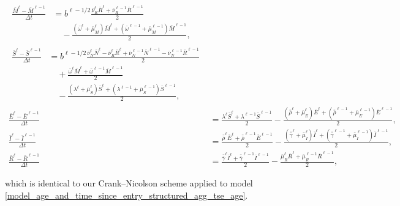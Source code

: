 \documentclass{jpmarticle}
\let\subequationsorig\subequations%
\let\endsubequationsorig\endsubequations%
\renewenvironment{subequations}{
  \subequationsorig
  \renewcommand{\theequation}{\theparentequation.\arabic{equation}}
}{
  \endsubequationsorig
}
\begin{document}
\begin{subequations}
  \label{numerics_age_and_time_since_entry_structured_agg_tse_age}
  \begin{align}
    \begin{split}
      \frac{\bar{M}^{\ell} - \bar{M}^{\ell - 1}}{\Delta t}
      &= b^{\ell - 1 / 2} \frac{\bar{\nu}_R^{\ell} \bar{R}^{\ell}
        + \bar{\nu}_R^{\ell - 1} \bar{R}^{\ell - 1}}{2}
      \\ & \quad {}
      - \frac{(\bar{\omega}^{\ell} + \bar{\mu}_M^{\ell}) \bar{M}^{\ell}
        + (\bar{\omega}^{\ell - 1} + \bar{\mu}_M^{\ell - 1}) \bar{M}^{\ell - 1}}
      {2},
    \end{split}
    \\
    \begin{split}
      \frac{\bar{S}^{\ell} - \bar{S}^{\ell - 1}}{\Delta t}
      &= b^{\ell - 1 / 2}
      \frac{\bar{\nu}_N^{\ell} \bar{N}^{\ell}
        - \bar{\nu}_R^{\ell} \bar{R}^{\ell}
        + \bar{\nu}_N^{\ell - 1} \bar{N}^{\ell - 1}
        - \bar{\nu}_N^{\ell - 1} \bar{R}^{\ell - 1}}{2}
      \\ & \quad {}
      + \frac{\bar{\omega}^{\ell} \bar{M}^{\ell}
        + \bar{\omega}^{\ell - 1} \bar{M}^{\ell - 1}}{2}
      \\ & \quad {}
      - \frac{(\lambda^{\ell} + \bar{\mu}_S^{\ell}) \bar{S}^{\ell}
        + (\lambda^{\ell - 1} + \bar{\mu}_S^{\ell - 1}) \bar{S}^{\ell - 1}}{2},
    \end{split}
    \\
    \frac{\bar{E}^{\ell} - \bar{E}^{\ell - 1}}{\Delta t}
    &= \frac{\lambda^{\ell} \bar{S}^{\ell}
      + \lambda^{\ell - 1} \bar{S}^{\ell - 1}}{2}
    - \frac{(\bar{\bar{\rho}}^{\ell} + \bar{\mu}_E^{\ell}) \bar{E}^{\ell}
      + (\bar{\bar{\rho}}^{\ell - 1} + \bar{\mu}_E^{\ell - 1}) \bar{E}^{\ell - 1}}
    {2},
    \\
    \frac{\bar{I}^{\ell} - \bar{I}^{\ell - 1}}{\Delta t}
    &= \frac{\bar{\bar{\rho}}^{\ell} \bar{E}^{\ell}
      + \bar{\bar{\rho}}^{\ell - 1} \bar{E}^{\ell - 1}} {2}
    - \frac{(\bar{\bar{\gamma}}^{\ell} + \bar{\mu}_I^{\ell}) \bar{I}^{\ell}
      + (\bar{\bar{\gamma}}^{\ell - 1} + \bar{\mu}_I^{\ell - 1})
      \bar{I}^{\ell - 1}}
    {2},
    \\
    \frac{\bar{R}^{\ell} - \bar{R}^{\ell - 1}}{\Delta t}
    &= \frac{\bar{\bar{\gamma}}^{\ell} \bar{I}^{\ell}
      + \bar{\bar{\gamma}}^{\ell - 1} \bar{I}^{\ell - 1}}
    {2}
    - \frac{\bar{\mu}_R^{\ell} \bar{R}^{\ell}
      + \bar{\mu}_R^{\ell - 1} \bar{R}^{\ell - 1}}
    {2},
  \end{align}
\end{subequations}
which is identical to our Crank--Nicolson scheme applied to model
\eqref{model_age_and_time_since_entry_structured_agg_tse_age}.
\end{document}

